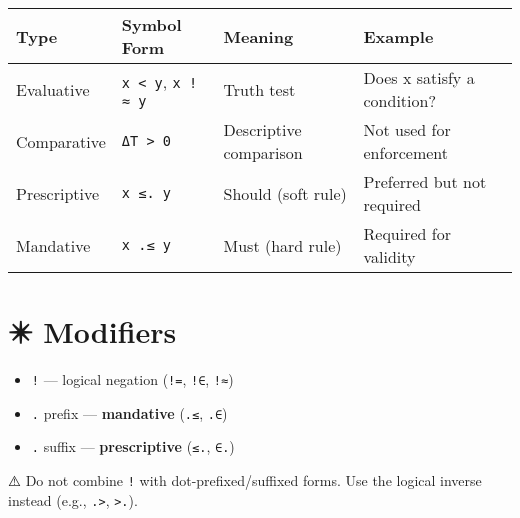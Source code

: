 \documentclass[
  letterpaper,
]{book}
\providecommand{\tightlist}{%
  \setlength{\itemsep}{0pt}\setlength{\parskip}{0pt}}
\begin{document}
\begin{longtable}[]{@{}
  >{\raggedright\arraybackslash}p{}
  >{\raggedright\arraybackslash}p{}
  >{\raggedright\arraybackslash}p{}
  >{\raggedright\arraybackslash}p{}@{}}
\toprule\noalign{}
\begin{minipage}[b]{\linewidth}\raggedright
Type
\end{minipage} & \begin{minipage}[b]{\linewidth}\raggedright
Symbol Form
\end{minipage} & \begin{minipage}[b]{\linewidth}\raggedright
Meaning
\end{minipage} & \begin{minipage}[b]{\linewidth}\raggedright
Example
\end{minipage} \\
\midrule\noalign{}
\endhead
\bottomrule\noalign{}
\endlastfoot
Evaluative & \texttt{x\ \textless{}\ y}, \texttt{x\ !≈\ y} & Truth test
& Does x satisfy a condition? \\
Comparative & \texttt{ΔT\ \textgreater{}\ 0} & Descriptive comparison &
Not used for enforcement \\
Prescriptive & \texttt{x\ ≤.\ y} & Should (soft rule) & Preferred but
not required \\
Mandative & \texttt{x\ .≤\ y} & Must (hard rule) & Required for
validity \\
\end{longtable}

\section{✴️ Modifiers}\label{modifiers}

\begin{itemize}
\tightlist
\item
  \texttt{!} --- logical negation (\texttt{!=}, \texttt{!∈},
  \texttt{!≈})
\item
  \texttt{.} prefix --- \textbf{mandative} (\texttt{.≤}, \texttt{.∈})
\item
  \texttt{.} suffix --- \textbf{prescriptive} (\texttt{≤.}, \texttt{∈.})
\end{itemize}

⚠️ Do not combine \texttt{!} with dot-prefixed/suffixed forms. Use the
logical inverse instead (e.g., \texttt{.\textgreater{}},
\texttt{\textgreater{}.}).
\end{document}
